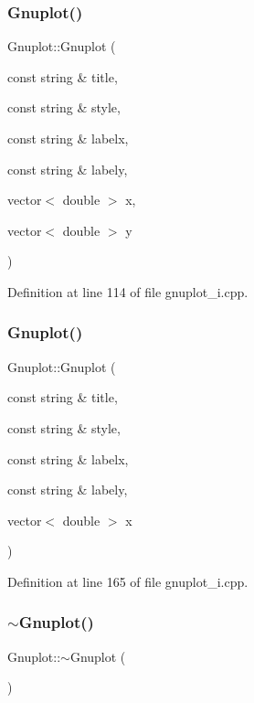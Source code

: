 \subsubsection{\texorpdfstring{Gnuplot()}{Gnuplot()}\hspace{0.1cm}{\footnotesize\ttfamily [3/4]}}
{\footnotesize\ttfamily Gnuplot\+::\+Gnuplot (\begin{DoxyParamCaption}\item[{const string \&}]{title,  }\item[{const string \&}]{style,  }\item[{const string \&}]{labelx,  }\item[{const string \&}]{labely,  }\item[{vector$<$ double $>$}]{x,  }\item[{vector$<$ double $>$}]{y }\end{DoxyParamCaption})}



Definition at line 114 of file gnuplot\+\_\+i.\+cpp.

\mbox{\label{class_gnuplot_a22ec497060171153b0ce321763e9c7f9}} 
\subsubsection{\texorpdfstring{Gnuplot()}{Gnuplot()}\hspace{0.1cm}{\footnotesize\ttfamily [4/4]}}
{\footnotesize\ttfamily Gnuplot\+::\+Gnuplot (\begin{DoxyParamCaption}\item[{const string \&}]{title,  }\item[{const string \&}]{style,  }\item[{const string \&}]{labelx,  }\item[{const string \&}]{labely,  }\item[{vector$<$ double $>$}]{x }\end{DoxyParamCaption})}



Definition at line 165 of file gnuplot\+\_\+i.\+cpp.

\mbox{\label{class_gnuplot_a78a68f621caa87d1f34324fcd093c7bd}} 
\subsubsection{\texorpdfstring{$\sim$\+Gnuplot()}{~Gnuplot()}}
{\footnotesize\ttfamily Gnuplot\+::$\sim$\+Gnuplot (\begin{DoxyParamCaption}{ }\end{DoxyParamCaption})}



